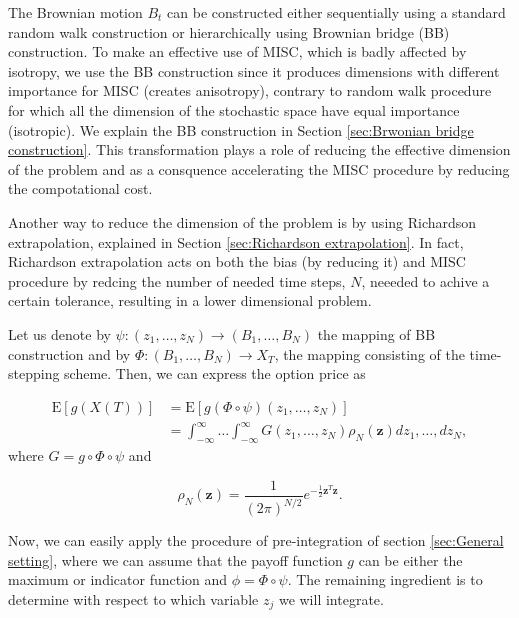 \documentclass[11pt]{article}
\newcommand{\expt}[1]{\mathrm{E}\left[#1\right]}
\newcommand{\PERIOD}{.}
\newcommand{\COMMA}{,}
\begin{document}
The Brownian motion $B_t$ can be constructed either sequentially using a standard random walk construction or hierarchically using Brownian bridge (BB) construction. To make an effective use of MISC, which is badly affected by isotropy, we use the BB construction since it produces  dimensions with different importance for MISC (creates anisotropy), contrary to random walk procedure for which all the dimension of the stochastic space have equal importance (isotropic). We explain the BB construction in Section \ref{sec:Brwonian bridge construction}. This transformation plays a role of reducing the effective dimension of the problem and as a consquence accelerating the MISC procedure by reducing the compotational cost.



Another way to reduce the dimension of the problem is by using Richardson extrapolation, explained in Section \ref{sec:Richardson extrapolation}. In fact, Richardson extrapolation acts on both the bias (by reducing it) and MISC procedure by redcing the number of needed time steps, $N$, neeeded to achive a certain tolerance, resulting in a lower dimensional problem.





Let us denote by $\psi: (z_1,\dots,z_N) \rightarrow (B_1,\dots,B_N)$ the mapping of BB construction and by $\Phi: (B_1,\dots,B_N) \rightarrow X_T$, the mapping consisting of the time-stepping scheme. Then, we can express the option price as

\begin{align}\label{eq: option price as integral}
\expt{g(X(T))}&=		\expt{g\left(\Phi \circ \psi \right) (z_1,\dots,z_N)} \nonumber\\
&=\int_{-\infty}^{\infty} \dots \int_{-\infty}^{\infty} G(z_1,\dots,z_N) \rho_N(\mathbf{z}) dz_1,\dots,dz_N \COMMA
\end{align}
where $G=g \circ \Phi \circ \psi$ and

\begin{equation}\label{eq: multivariate gaussian distribution}
\rho_N(\mathbf{z})=\frac{1}{(2 \pi)^{N/2}} e^{-\frac{1}{2} \mathbf{z}^T \mathbf{z}} \PERIOD
\end{equation}


Now, we can easily apply the procedure of pre-integration  of section \ref{sec:General setting}, where we can assume that the payoff function $g$ can be either the  maximum or indicator function and $\phi=\Phi \circ \psi$. The remaining ingredient is to determine with respect to which variable $z_j$ we will integrate.
\end{document}

